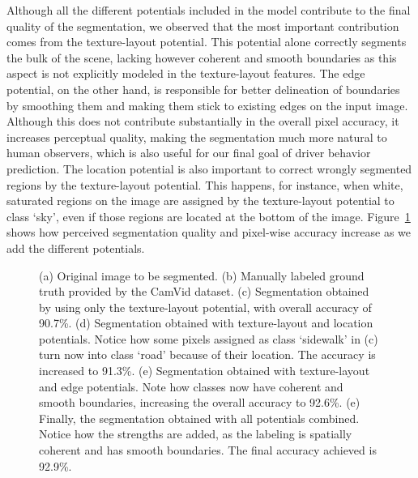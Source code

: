 Although all the different potentials included in the model contribute to the final quality of the segmentation, we observed that the most important contribution comes from the texture-layout potential. This potential alone correctly segments the bulk of the scene, lacking however coherent and smooth boundaries as this aspect is not explicitly modeled in the texture-layout features. The edge potential, on the other hand, is responsible for better delineation of boundaries by smoothing them and making them stick to existing edges on the input image. Although this does not contribute substantially in the overall pixel accuracy, it increases perceptual quality, making the segmentation much more natural to human observers, which is also useful for our final goal of driver behavior prediction. The location potential is also important to correct wrongly segmented regions by the texture-layout potential. This happens, for instance, when white, saturated regions on the image are assigned by the texture-layout potential to class `sky', even if those regions are located at the bottom of the image. Figure~\ref{fig:influence_of_potentials} shows how perceived segmentation quality and pixel-wise accuracy increase as we add the different potentials.

\begin{figure}[htb]
\caption[Influence of the different potentials on segmentation quality]{(a) Original image to be segmented. (b) Manually labeled ground truth provided by the CamVid dataset. (c) Segmentation obtained by using only the texture-layout potential, with overall accuracy of 90.7\%. (d) Segmentation obtained with texture-layout and location potentials. Notice how some pixels assigned as class `sidewalk' in (c) turn now into class `road' because of their location. The accuracy is increased to 91.3\%. (e) Segmentation obtained with texture-layout and edge potentials. Note how classes now have coherent and smooth boundaries, increasing the overall accuracy to 92.6\%. (e) Finally, the segmentation obtained with all potentials combined. Notice how the strengths are added, as the labeling is spatially coherent and has smooth boundaries. The final accuracy achieved is 92.9\%.}
\label{fig:influence_of_potentials}
\end{figure}

